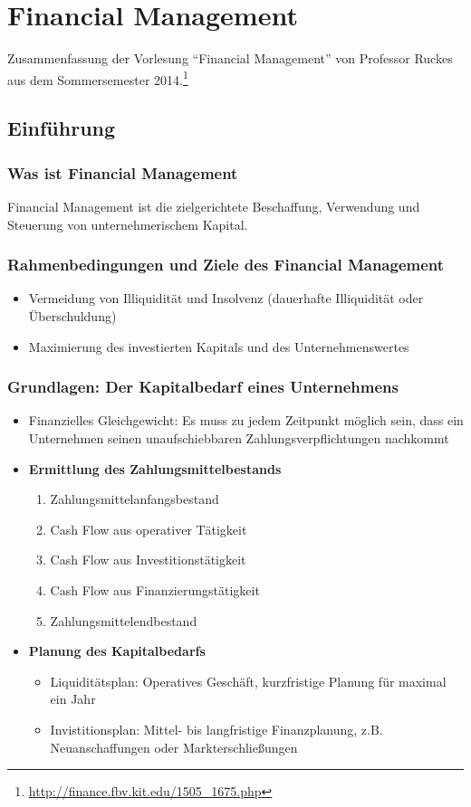 \chapter{Financial Management}

Zusammenfassung der Vorlesung "`Financial Management"' von Professor Ruckes aus dem Sommersemester 2014.\footnote{\url{http://finance.fbv.kit.edu/1505_1675.php}}

\section{Einführung}

\subsection{Was ist Financial Management}
Financial Management ist die zielgerichtete Beschaffung, Verwendung und Steuerung von unternehmerischem Kapital.


\subsection{Rahmenbedingungen und Ziele des Financial Management}
\begin{itemize}
	\item Vermeidung von Illiquidität und Insolvenz (dauerhafte Illiquidität oder Überschuldung)
	\item Maximierung des investierten Kapitals und des Unternehmenswertes
\end{itemize}


\subsection{Grundlagen: Der Kapitalbedarf eines Unternehmens}
\begin{itemize}
	\item Finanzielles Gleichgewicht: Es muss zu jedem Zeitpunkt möglich sein, dass ein Unternehmen seinen unaufschiebbaren Zahlungsverpflichtungen nachkommt
	\item \textbf{Ermittlung des Zahlungsmittelbestands}
	\begin{enumerate}
		\item Zahlungsmittelanfangsbestand
		\item Cash Flow aus operativer Tätigkeit
		\item Cash Flow aus Investitionstätigkeit
		\item Cash Flow aus Finanzierungstätigkeit
		\item Zahlungsmittelendbestand
	\end{enumerate}
	\item \textbf{Planung des Kapitalbedarfs}
	\begin{itemize}
		\item Liquiditätsplan: Operatives Geschäft, kurzfristige Planung für maximal ein Jahr
		\item Invistitionsplan: Mittel- bis langfristige Finanzplanung, z.B. Neuanschaffungen oder Markterschließungen
	\end{itemize}
\end{itemize}


